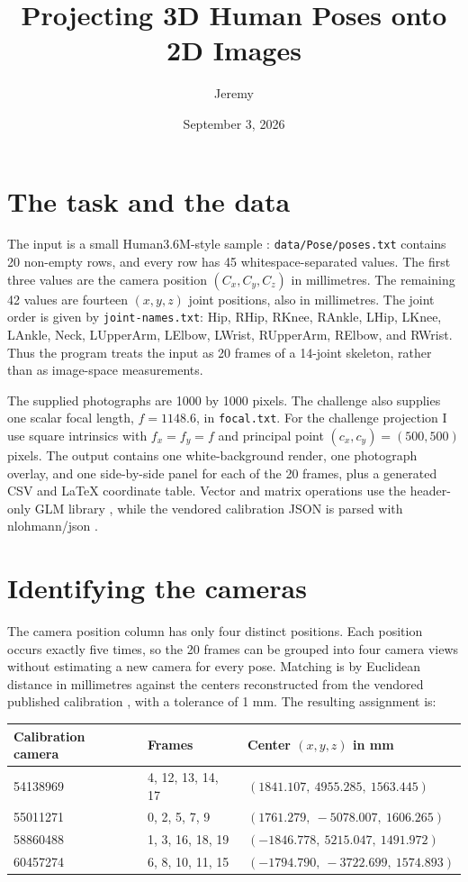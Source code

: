 \documentclass[11pt]{article}
\title{Projecting 3D Human Poses onto 2D Images}
\author{Jeremy}
\date{September 3, 2026}
\begin{document}
\maketitle

\section{The task and the data}
The input is a small Human3.6M-style sample \cite{h36m}: \texttt{data/Pose/poses.txt}
contains 20 non-empty rows, and every row has 45 whitespace-separated values.
The first three values are the camera position $(C_x,C_y,C_z)$ in millimetres.
The remaining 42 values are fourteen $(x,y,z)$ joint positions, also in
millimetres.  The joint order is given by \texttt{joint-names.txt}: Hip,
RHip, RKnee, RAnkle, LHip, LKnee, LAnkle, Neck, LUpperArm, LElbow, LWrist,
RUpperArm, RElbow, and RWrist.  Thus the program treats the input as 20
frames of a 14-joint skeleton, rather than as image-space measurements.

The supplied photographs are 1000 by 1000 pixels.  The challenge also supplies
one scalar focal length, $f=1148.6$, in \texttt{focal.txt}.  For the challenge
projection I use square intrinsics with $f_x=f_y=f$ and principal point
$(c_x,c_y)=(500,500)$ pixels.  The output contains one white-background render,
one photograph overlay, and one side-by-side panel for each of the 20 frames,
plus a generated CSV and LaTeX coordinate table.  Vector and matrix operations
use the header-only GLM library \cite{glm}, while the vendored calibration JSON
is parsed with nlohmann/json \cite{json}.

\section{Identifying the cameras}
The camera position column has only four distinct positions.  Each position
occurs exactly five times, so the 20 frames can be grouped into four camera
views without estimating a new camera for every pose.  Matching is by Euclidean
 distance in millimetres against the centers reconstructed from the vendored
published calibration \cite{calib}, with a tolerance of 1 mm.  The resulting assignment is:

\begin{center}
\begin{tabular}{l l l}
\toprule
Calibration camera & Frames & Center $(x,y,z)$ in mm\\
\midrule
54138969 & 4, 12, 13, 14, 17 & $(1841.107,\ 4955.285,\ 1563.445)$\\
55011271 & 0, 2, 5, 7, 9 & $(1761.279,\ -5078.007,\ 1606.265)$\\
58860488 & 1, 3, 16, 18, 19 & $(-1846.778,\ 5215.047,\ 1491.972)$\\
60457274 & 6, 8, 10, 11, 15 & $(-1794.790,\ -3722.699,\ 1574.893)$\\
\bottomrule
\end{tabular}
\end{center}
\end{document}
